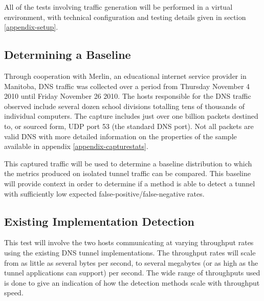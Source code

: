 \documentclass[12pt]{report}
\theoremstyle{remark}
\theoremstyle{definition}
\theoremstyle{definition}
\theoremstyle{definition}
\begin{document}
All of the tests involving traffic generation will be performed in a virtual
environment, with technical configuration and testing details given in section
\ref{appendix-setup}.

\subsection{Determining a Baseline}
\label{baseline}
Through cooperation
with Merlin, an educational internet service provider in Manitoba, DNS traffic
was collected over a period from Thursday November 4 2010 until Friday November
26 2010. The hosts responsible for the DNS
traffic observed include several dozen school divisions totalling tens of
thousands of individual computers. The capture includes just over one billion
packets destined to, or sourced form, UDP port 53 (the standard DNS port). Not
all packets are valid DNS with more detailed information on the properties of
the sample available in appendix \ref{appendix-capturestats}.

This captured traffic will be used to determine a baseline distribution to which the metrics produced on isolated tunnel traffic can be compared. This baseline will provide context in order to determine if a method is able to detect a tunnel with sufficiently low expected false-positive/false-negative rates.


\subsection{Existing Implementation Detection}
\label{test-existing}
This test
will involve the two hosts communicating at varying throughput rates using the
existing DNS tunnel implementations. The throughput rates will scale from as
little as several bytes per second, to several megabytes (or as high as the
tunnel applications can support) per second. The wide range of throughputs used
is done to give an indication of how the detection methods scale with throughput
speed.
\end{document}
